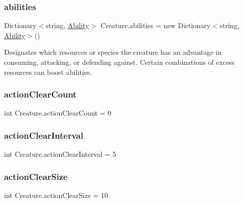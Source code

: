 \subsubsection{\texorpdfstring{abilities}{abilities}}
{\footnotesize\ttfamily Dictionary$<$string, \mbox{\hyperlink{class_ability}{Ability}}$>$ Creature.\+abilities = new Dictionary$<$string, \mbox{\hyperlink{class_ability}{Ability}}$>$()}



Designates which resources or species the creature has an advantage in consuming, attacking, or defending against. Certain combinations of excess resources can boost abilities. 

\mbox{\label{class_creature_abb93da679575f5a4fb5c8072c831b7f0}} 
\subsubsection{\texorpdfstring{action\+Clear\+Count}{actionClearCount}}
{\footnotesize\ttfamily int Creature.\+action\+Clear\+Count = 0}

\mbox{\label{class_creature_a22b0a217ba84279341ad580b13080258}} 
\subsubsection{\texorpdfstring{action\+Clear\+Interval}{actionClearInterval}}
{\footnotesize\ttfamily int Creature.\+action\+Clear\+Interval = 5}

\mbox{\label{class_creature_af4cfa9181ab0df58a2c64b6c3b9725f8}} 
\subsubsection{\texorpdfstring{action\+Clear\+Size}{actionClearSize}}
{\footnotesize\ttfamily int Creature.\+action\+Clear\+Size = 10}

\mbox{\label{class_creature_ab75f97aaea730b1da2bd00cc28555ac6}} 
